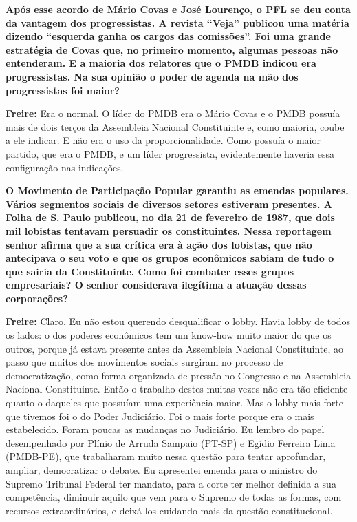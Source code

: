 \textbf{Após esse acordo de Mário Covas e José Lourenço, o PFL se deu
conta da vantagem dos progressistas. A revista ``Veja'' publicou uma
matéria dizendo ``esquerda ganha os cargos das comissões''. Foi uma
grande estratégia de Covas que, no primeiro momento, algumas pessoas não
entenderam. E a maioria dos relatores que o PMDB indicou era
progressistas. Na sua opinião o poder de agenda na mão dos progressistas
foi maior?}

\textbf{Freire:} Era o normal. O líder do PMDB era o Mário Covas e o
PMDB possuía mais de dois terços da Assembleia Nacional Constituinte e,
como maioria, coube a ele indicar. E não era o uso da proporcionalidade.
Como possuía o maior partido, que era o PMDB, e um líder progressista,
evidentemente haveria essa configuração nas indicações.

\textbf{O Movimento de Participação Popular garantiu as emendas
populares. Vários segmentos sociais de diversos setores estiveram
presentes. A Folha de S. Paulo publicou, no dia 21 de fevereiro de 1987,
que dois mil lobistas tentavam persuadir os constituintes. Nessa
reportagem senhor afirma que a sua crítica era à ação dos lobistas, que
não antecipava o seu voto e que os grupos econômicos sabiam de tudo o
que sairia da Constituinte. Como foi combater esses grupos empresariais?
O senhor considerava ilegítima a atuação dessas corporações?}

\textbf{Freire:} Claro. Eu não estou querendo desqualificar o lobby.
Havia lobby de todos os lados: o dos poderes econômicos tem um know-how
muito maior do que os outros, porque já estava presente antes da
Assembleia Nacional Constituinte, ao passo que muitos dos movimentos
sociais surgiram no processo de democratização, como forma organizada de
pressão no Congresso e na Assembleia Nacional Constituinte. Então o
trabalho destes muitas vezes não era tão eficiente quanto o daqueles que
possuíam uma experiência maior. Mas o lobby mais forte que tivemos foi o
do Poder Judiciário. Foi o mais forte porque era o mais estabelecido.
Foram poucas as mudanças no Judiciário. Eu lembro do papel desempenhado
por Plínio de Arruda Sampaio (PT-SP) e Egídio Ferreira Lima (PMDB-PE),
que trabalharam muito nessa questão para tentar aprofundar, ampliar,
democratizar o debate. Eu apresentei emenda para o ministro do Supremo
Tribunal Federal ter mandato, para a corte ter melhor definida a sua
competência, diminuir aquilo que vem para o Supremo de todas as formas,
com recursos extraordinários, e deixá-los cuidando mais da questão
constitucional.

